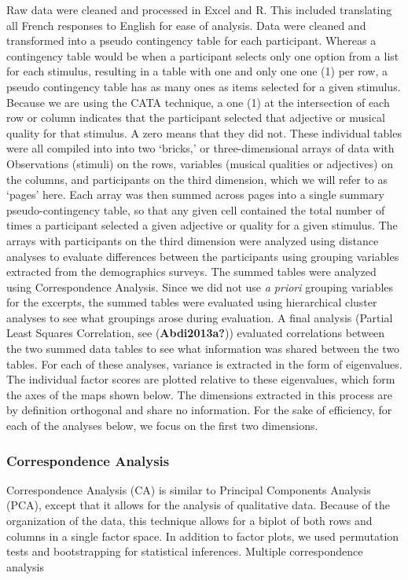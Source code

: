\documentclass[
  english,
  man,floatsintext]{apa6}
\begin{document}
Raw data were cleaned and processed in Excel and R. This included translating all French responses to English for ease of analysis. Data were cleaned and transformed into a pseudo contingency table for each participant. Whereas a contingency table would be when a participant selects only one option from a list for each stimulus, resulting in a table with one and only one one (1) per row, a pseudo contingency table has as many ones as items selected for a given stimulus. Because we are using the CATA technique, a one (1) at the intersection of each row or column indicates that the participant selected that adjective or musical quality for that stimulus. A zero means that they did not. These individual tables were all compiled into into two `bricks,' or three-dimensional arrays of data with Observations (stimuli) on the rows, variables (musical qualities or adjectives) on the columns, and participants on the third dimension, which we will refer to as `pages' here. Each array was then summed across pages into a single summary pseudo-contingency table, so that any given cell contained the total number of times a participant selected a given adjective or quality for a given stimulus.
The arrays with participants on the third dimension were analyzed using distance analyses to evaluate differences between the participants using grouping variables extracted from the demographics surveys. The summed tables were analyzed using Correspondence Analysis. Since we did not use \emph{a priori} grouping variables for the excerpts, the summed tables were evaluated using hierarchical cluster analyses to see what groupings arose during evaluation.
A final analysis (Partial Least Squares Correlation, see (\textbf{Abdi2013a?})) evaluated correlations between the two summed data tables to see what information was shared between the two tables.
For each of these analyses, variance is extracted in the form of eigenvalues. The individual factor scores are plotted relative to these eigenvalues, which form the axes of the maps shown below. The dimensions extracted in this process are by definition orthogonal and share no information. For the sake of efficiency, for each of the analyses below, we focus on the first two dimensions.

\hypertarget{correspondence-analysis}{%
\subsubsection{Correspondence Analysis}\label{correspondence-analysis}}

Correspondence Analysis (CA) is similar to Principal Components Analysis (PCA), except that it allows for the analysis of qualitative data. Because of the organization of the data, this technique allows for a biplot of both rows and columns in a single factor space. In addition to factor plots, we used permutation tests and bootstrapping for statistical inferences. Multiple correspondence analysis
\end{document}
